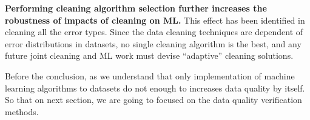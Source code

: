 \textbf{Performing cleaning algorithm selection further increases the robustness of impacts of cleaning on ML. }This effect has been identified in cleaning all the error types. Since the data cleaning techniques are dependent of error distributions in datasets, no single cleaning algorithm is the best, and any future joint cleaning and
ML work must devise “adaptive” cleaning solutions.

Before the conclusion, as we understand that only implementation of machine learning algorithms to datasets do not enough to increases data quality by itself. So that on next section, we are going to focused on the data quality verification methods.  




